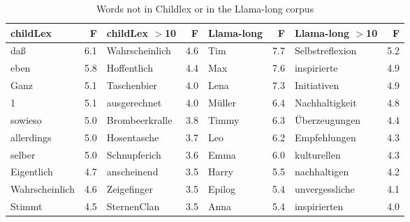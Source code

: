 \documentclass[doc, a4paper, anonymous]{apa7}
\begin{document}
\begin{table}[!htbp]
\caption{Words not in Childlex or in the Llama-long corpus}
\centering
\begin{tabular}{lrlrlrlr}
  \hline
childLex & F & childLex $>$10 & F & Llama-long & F & Llama-long $>$10 & F \\ 
  \hline
daß & 6.1 & Wahrscheinlich & 4.6 & Tim & 7.7 & Selbstreflexion & 5.2 \\ 
  eben & 5.8 & Hoffentlich & 4.4 & Max & 7.6 & inspirierte & 4.9 \\ 
  Ganz & 5.1 & Taschenbier & 4.0 & Lena & 7.3 & Initiativen & 4.9 \\ 
  1 & 5.1 & ausgerechnet & 4.0 & Müller & 6.4 & Nachhaltigkeit & 4.8 \\ 
  sowieso & 5.0 & Brombeerkralle & 3.8 & Timmy & 6.3 & Überzeugungen & 4.4 \\ 
  allerdings & 5.0 & Hosentasche & 3.7 & Leo & 6.2 & Empfehlungen & 4.3 \\ 
  selber & 5.0 & Schnupferich & 3.6 & Emma & 6.0 & kulturellen & 4.3 \\ 
  Eigentlich & 4.7 & anscheinend & 3.5 & Harry & 5.5 & nachhaltigen & 4.2 \\ 
  Wahrscheinlich & 4.6 & Zeigefinger & 3.5 & Epilog & 5.4 & unvergessliche & 4.1 \\ 
  Stimmt & 4.5 & SternenClan & 3.5 & Anna & 5.4 & inspirierten & 4.0 \\ 
   \hline
\end{tabular}
\label{words-lllo}
\end{table}
\end{document}
